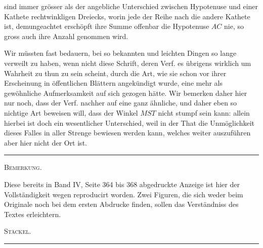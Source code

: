 sind immer grösser als der angebliche Unterschied zwischen Hypotenuse und einer
Kathete  rechtwinkligen Dreiecks, worin jede der Reihe nach
die andere Kathete ist, demungeachtet erschöpft ihre Summe offenbar die
Hypotenuse $AC$ nie, so gross auch ihre Anzahl genommen wird.

Wir müssten fast bedauern, bei so bekannten und leichten Dingen so lange
verweilt zu haben, wenn nicht diese Schrift, deren Verf. es übrigens wirklich um
Wahrheit zu thun zu sein scheint, durch die Art, wie sie schon vor ihrer
Erscheinung in öffentlichen Blättern angekündigt wurde, eine mehr als gewöhnliche
Aufmerksamkeit auf sich gezogen hätte. Wir bemerken daher hier nur noch, dass
der Verf. nachher auf eine ganz ähnliche, und daher eben so nichtige Art beweisen
will, dass der Winkel $MST$ nicht stumpf sein kann: allein hierbei ist doch ein
wesentlicher Unterschied, weil in der That die Unmöglichkeit dieses Falles in
aller Strenge bewiesen werden kann, welches weiter auszuführen aber hier nicht
der Ort ist.

\begin{center}\rule{3cm}{0.4pt}\end{center}

\begin{center}
\textsc{Bemerkung.}
\end{center}

Diese bereits in Band IV, Seite 364 bis 368 abgedruckte Anzeige ist hier der
Vollständigkeit wegen reproducirt worden. Zwei Figuren, die sich weder beim
Originale noch bei dem ersten Abdrucke finden, sollen das Verständniss des Textes
erleichtern.

\begin{flushright}\textsc{Stäckel.}\end{flushright}

\begin{center}\rule{3cm}{0.4pt}\end{center}
